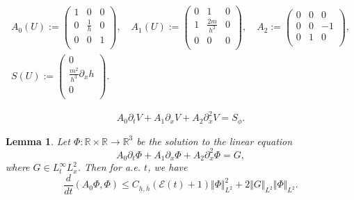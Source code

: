 \documentclass[10pt,a4paper]{amsart}
\newtheorem{lemma}{Lemma}
\begin{document}
\begin{equation}\label{def:As}
\begin{gathered}
    A_0(U) := \begin{pmatrix}
        1 & 0 & 0 \\
        0 & \frac{1}{h} & 0 \\
        0 & 0 & 1 \\
    \end{pmatrix}, \quad A_1(U):=\begin{pmatrix}
        0 & 1 & 0 \\
        1 & \frac{2m}{h^2} & 0 \\
        0 & 0 & 0 \\
    \end{pmatrix}, \quad A_2:=\begin{pmatrix}
        0 & 0 & 0 \\
        0 & 0 & -1 \\
        0 & 1 & 0 \\
    \end{pmatrix},  \\
    S(U):=\begin{pmatrix}
        0 \\
        \frac{m^2}{h^3}\partial_x h \\
        0 \\
    \end{pmatrix}. 
    \end{gathered}
\end{equation} 

\begin{equation}
    \label{ShallowWaterV}
    A_0\partial_t V+A_1\partial_x V+A_2\partial_x^2 V={S}_{\phi}.
\end{equation}

\begin{lemma}
\label{LemmaPhi}
    Let $\Phi: \mathbb R \times \mathbb R \to \mathbb R^3$ be the solution to the linear equation
    \begin{equation}
    \label{PhiEq}
    A_0\partial_t \Phi+A_1\partial_x \Phi+A_2\partial_x^2 \Phi=G,
    \end{equation}
    where $G\in L_t^{\infty}L^2_x$. Then for a.e. $ t $, we have
    \begin{equation}
    \label{LemmaPhiEstimate}
        \frac{d}{dt} (A_0 \Phi,\Phi) \leq C_{\underline h, \overline h} (\mathcal E(t) + 1) \Vert\Phi\Vert_{L^2}^2+ 2 \Vert G\Vert_{L^2} \Vert\Phi\Vert_{L^2}.
    \end{equation}
\end{lemma}
\end{document}
